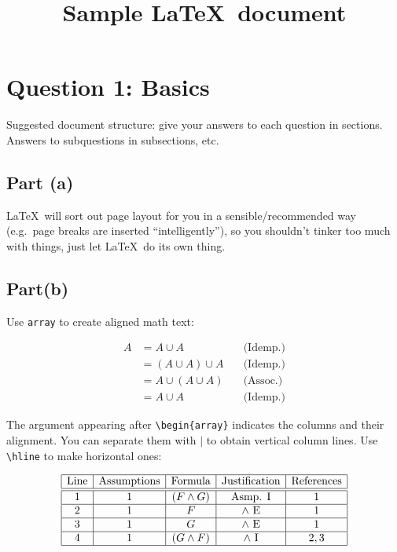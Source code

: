 \documentclass{article} %
\begin{document}
\title{Sample \LaTeX\ document}
\author{} %
\date{} %
\maketitle %

\section*{Question 1: Basics} %

Suggested document structure: give your answers to each question in sections.  Answers to subquestions in subsections, etc. 


\subsection*{Part (a)} %


\LaTeX\ will sort out page layout for you in a sensible/recommended way (e.g.\ page breaks are inserted ``intelligently''), so you shouldn't tinker too much with things, just let \LaTeX\ do its own thing.

\subsection*{Part(b)}
Use \texttt{array} to create aligned math text:

\[
\begin{array}{rlr} %
  A &= A \cup A &\quad\mbox{(Idemp.)} \\
  &= (A \cup A) \cup A & \quad\mbox{(Idemp.)}\\
  &= A \cup (A \cup A) & \quad\mbox{(Assoc.)}\\
  &= A \cup A & \quad\mbox{(Idemp.)}
\end{array}
\]

The argument appearing after \verb|\begin{array}| indicates the columns and their alignment.  You can separate them with $\mid$ to obtain vertical column lines.  Use \verb|\hline| to make horizontal ones:

\[
\begin{array}{|c|c|c|c|c|}
\hline
\text{Line} & \text{Assumptions} & \text{Formula} & \text{Justification} & \text{References}\\
\hline
\hline
1 & 1 & (F \land G) & \text{Asmp. I} & 1 \\
\hline
2 & 1 & F & \land\text{ E} & 1\\
\hline
3 & 1 & G & \land\text{ E} & 1\\
\hline
4 & 1 & (G \land F) & \land\text{ I} & 2,3\\
\hline
\end{array}
\]
\end{document}
